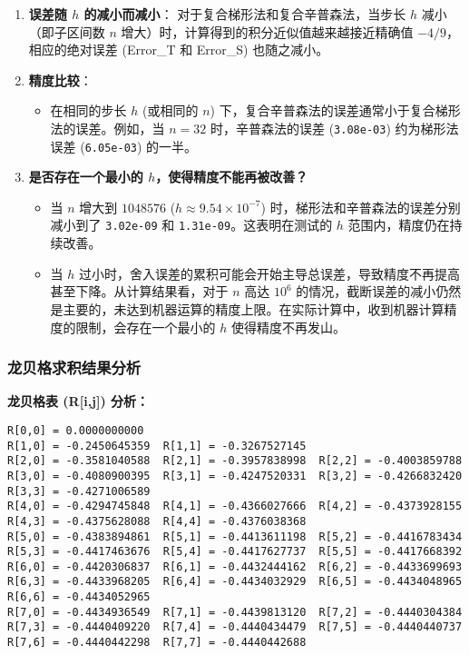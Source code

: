 \documentclass[11pt]{article}
\providecommand{\tightlist}{%
      \setlength{\itemsep}{0pt}\setlength{\parskip}{0pt}}
\begin{document}
\begin{enumerate}
\def\labelenumi{\arabic{enumi}.}
\item
  \textbf{误差随 \(h\) 的减小而减小}：
  对于复合梯形法和复合辛普森法，当步长 \(h\) 减小（即子区间数 \(n\)
  增大）时，计算得到的积分近似值越来越接近精确值
  \(-4/9\)，相应的绝对误差 (Error\_T 和 Error\_S) 也随之减小。
\item
  \textbf{精度比较}：

  \begin{itemize}
  \tightlist
  \item
    在相同的步长 \(h\) (或相同的 \(n\))
    下，复合辛普森法的误差通常小于复合梯形法的误差。例如，当 \(n=32\)
    时，辛普森法的误差 (\texttt{3.08e-03}) 约为梯形法误差
    (\texttt{6.05e-03}) 的一半。
  \end{itemize}
\item
  \textbf{是否存在一个最小的 \(h\)，使得精度不能再被改善？}

  \begin{itemize}
  \tightlist
  \item
    当 \(n\) 增大到 \(1048576\) (\(h \approx 9.54 \times 10^{-7}\))
    时，梯形法和辛普森法的误差分别减小到了 \texttt{3.02e-09} 和
    \texttt{1.31e-09}。这表明在测试的 \(h\) 范围内，精度仍在持续改善。
  \item
    当 \(h\)
    过小时，舍入误差的累积可能会开始主导总误差，导致精度不再提高甚至下降。从计算结果看，对于
    \(n\) 高达 \(10^6\)
    的情况，截断误差的减小仍然是主要的，未达到机器运算的精度上限。在实际计算中，收到机器计算精度的限制，会存在一个最小的
    \(h\) 使得精度不再发山。
  \end{itemize}
\end{enumerate}

\subsubsection{龙贝格求积结果分析}\label{ux9f99ux8d1dux683cux6c42ux79efux7ed3ux679cux5206ux6790}

\textbf{龙贝格表 (R{[}i,j{]}) 分析：}

\begin{verbatim}
R[0,0] = 0.0000000000
R[1,0] = -0.2450645359  R[1,1] = -0.3267527145
R[2,0] = -0.3581040588  R[2,1] = -0.3957838998  R[2,2] = -0.4003859788
R[3,0] = -0.4080900395  R[3,1] = -0.4247520331  R[3,2] = -0.4266832420  R[3,3] = -0.4271006589
R[4,0] = -0.4294745848  R[4,1] = -0.4366027666  R[4,2] = -0.4373928155  R[4,3] = -0.4375628088  R[4,4] = -0.4376038368
R[5,0] = -0.4383894861  R[5,1] = -0.4413611198  R[5,2] = -0.4416783434  R[5,3] = -0.4417463676  R[5,4] = -0.4417627737  R[5,5] = -0.4417668392
R[6,0] = -0.4420306837  R[6,1] = -0.4432444162  R[6,2] = -0.4433699693  R[6,3] = -0.4433968205  R[6,4] = -0.4434032929  R[6,5] = -0.4434048965  R[6,6] = -0.4434052965
R[7,0] = -0.4434936549  R[7,1] = -0.4439813120  R[7,2] = -0.4440304384  R[7,3] = -0.4440409220  R[7,4] = -0.4440434479  R[7,5] = -0.4440440737  R[7,6] = -0.4440442298  R[7,7] = -0.4440442688
\end{verbatim}
\end{document}

